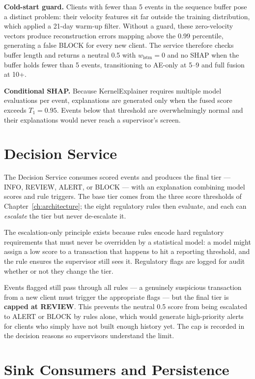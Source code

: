 \textbf{Cold-start guard.} Clients with fewer than 5 events in the sequence buffer pose a distinct problem: their velocity features sit far outside the training distribution, which applied a 21-day warm-up filter. Without a guard, these zero-velocity vectors produce reconstruction errors mapping above the 0.99 percentile, generating a false BLOCK for every new client. The service therefore checks buffer length and returns a neutral 0.5 with $w_{\text{lstm}} = 0$ and no SHAP when the buffer holds fewer than 5 events, transitioning to AE-only at 5--9 and full fusion at 10+.

\textbf{Conditional SHAP.} Because KernelExplainer requires multiple model evaluations per event, explanations are generated only when the fused score exceeds $T_1 = 0.95$. Events below that threshold are overwhelmingly normal and their explanations would never reach a supervisor's screen.

\section{Decision Service}

The Decision Service consumes scored events and produces the final tier --- INFO, REVIEW, ALERT, or BLOCK --- with an explanation combining model scores and rule triggers. The base tier comes from the three score thresholds of Chapter~\ref{ch:architecture}; the eight regulatory rules then evaluate, and each can \emph{escalate} the tier but never de-escalate it.

The escalation-only principle exists because rules encode hard regulatory requirements that must never be overridden by a statistical model: a model might assign a low score to a transaction that happens to hit a reporting threshold, and the rule ensures the supervisor still sees it. Regulatory flags are logged for audit whether or not they change the tier.

Events flagged  still pass through all rules --- a genuinely suspicious transaction from a new client must trigger the appropriate flags --- but the final tier is \textbf{capped at REVIEW}. This prevents the neutral 0.5 score from being escalated to ALERT or BLOCK by rules alone, which would generate high-priority alerts for clients who simply have not built enough history yet. The cap is recorded in the decision reasons so supervisors understand the limit.

\section{Sink Consumers and Persistence}

